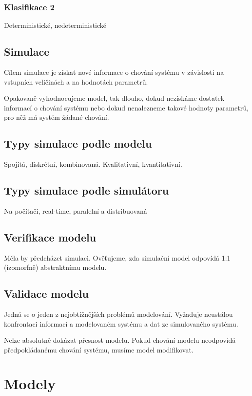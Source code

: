 \documentclass[11pt]{article}
\begin{document}
\subsubsection{Klasifikace 2}
\label{sec:orge6d7110}
Deterministické, nedeterministické

\subsection{Simulace}
\label{sec:org89a95a7}
Cílem simulace je získat nové informace o chování systému v závislosti na
vstupních veličinách a na hodnotách parametrů.

Opakovaně vyhodnocujeme model, tak dlouho, dokud nezískáme dostatek informací o
chování systému nebo dokud nenalezneme takové hodnoty parametrů, pro něž má
systém žádané chování.

\subsection{Typy simulace podle modelu}
\label{sec:orgc012bc4}
Spojitá, diskrétní, kombinovaná. Kvalitativní, kvantitativní.

\subsection{Typy simulace podle simulátoru}
\label{sec:orgc85885b}
Na počítači, real-time, paralelní a distribuovaná

\subsection{Verifikace modelu}
\label{sec:orgfd59ab0}
Měla by předcházet simulaci. Ověťujeme, zda simulační model odpovídá 1:1
(izomorfně) abstraktnímu modelu.

\subsection{Validace modelu}
\label{sec:org08bfb94}
Jedná se o jeden z nejobtížnějších problémů modelování. Vyžaduje neustálou
konfrontaci informací a modelovaném systému a dat ze simulovaného systému.

Nelze absolutně dokázat přesnost modelu. Pokud chování modelu neodpovídá
předpokládanému chování systému, musíme model modifikovat.

\section{Modely}
\label{sec:orgfa8fcf7}
\end{document}
